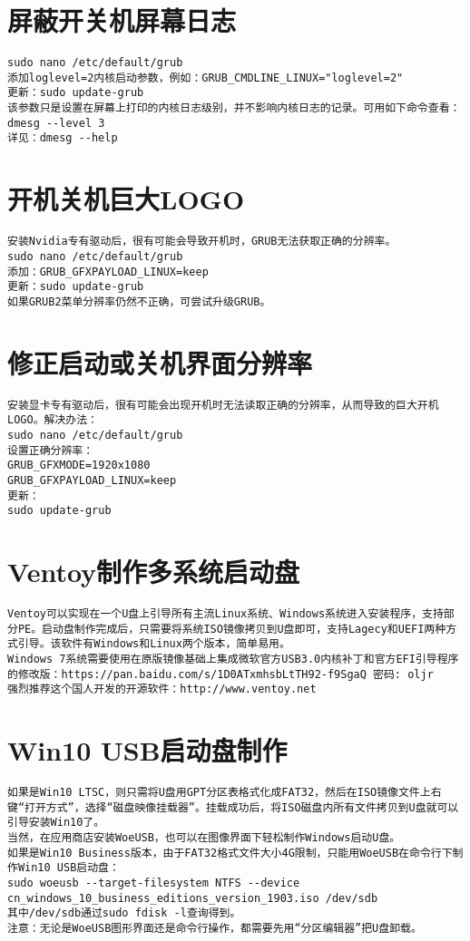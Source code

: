 \documentclass[a4paper,fontset=fandol,zihao=-4,linespread=1.2,oneside]{ctexbook}
\begin{document}
\section{屏蔽开关机屏幕日志}
\begin{lstlisting}
sudo nano /etc/default/grub
添加loglevel=2内核启动参数，例如：GRUB_CMDLINE_LINUX="loglevel=2"
更新：sudo update-grub
该参数只是设置在屏幕上打印的内核日志级别，并不影响内核日志的记录。可用如下命令查看：dmesg --level 3
详见：dmesg --help
\end{lstlisting}

\section{开机关机巨大LOGO}
\begin{lstlisting}
安装Nvidia专有驱动后，很有可能会导致开机时，GRUB无法获取正确的分辨率。
sudo nano /etc/default/grub
添加：GRUB_GFXPAYLOAD_LINUX=keep
更新：sudo update-grub
如果GRUB2菜单分辨率仍然不正确，可尝试升级GRUB。
\end{lstlisting}

\section{修正启动或关机界面分辨率}
\begin{lstlisting}
安装显卡专有驱动后，很有可能会出现开机时无法读取正确的分辨率，从而导致的巨大开机LOGO。解决办法：
sudo nano /etc/default/grub
设置正确分辨率：
GRUB_GFXMODE=1920x1080
GRUB_GFXPAYLOAD_LINUX=keep
更新：
sudo update-grub
\end{lstlisting}

\section{Ventoy制作多系统启动盘}
\begin{lstlisting}
Ventoy可以实现在一个U盘上引导所有主流Linux系统、Windows系统进入安装程序，支持部分PE。启动盘制作完成后，只需要将系统ISO镜像拷贝到U盘即可，支持Lagecy和UEFI两种方式引导。该软件有Windows和Linux两个版本，简单易用。
Windows 7系统需要使用在原版镜像基础上集成微软官方USB3.0内核补丁和官方EFI引导程序的修改版：https://pan.baidu.com/s/1D0ATxmhsbLtTH92-f9SgaQ 密码: oljr
强烈推荐这个国人开发的开源软件：http://www.ventoy.net
\end{lstlisting}

\section{Win10 USB启动盘制作}
\begin{lstlisting}
如果是Win10 LTSC，则只需将U盘用GPT分区表格式化成FAT32，然后在ISO镜像文件上右键“打开方式”，选择“磁盘映像挂载器”。挂载成功后，将ISO磁盘内所有文件拷贝到U盘就可以引导安装Win10了。
当然，在应用商店安装WoeUSB，也可以在图像界面下轻松制作Windows启动U盘。
如果是Win10 Business版本，由于FAT32格式文件大小4G限制，只能用WoeUSB在命令行下制作Win10 USB启动盘：
sudo woeusb --target-filesystem NTFS --device cn_windows_10_business_editions_version_1903.iso /dev/sdb
其中/dev/sdb通过sudo fdisk -l查询得到。
注意：无论是WoeUSB图形界面还是命令行操作，都需要先用“分区编辑器”把U盘卸载。
\end{lstlisting}
\end{document}
